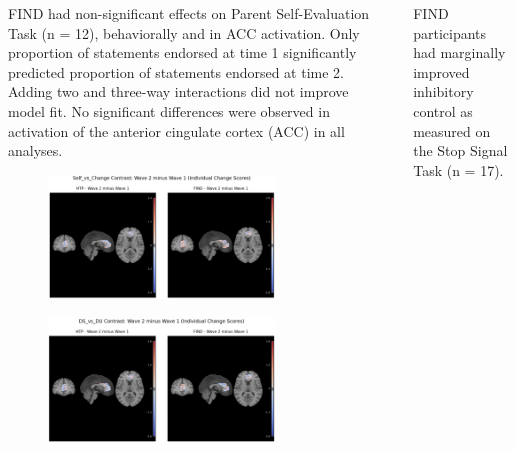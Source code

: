 \documentclass[final]{beamer}
\newlength{\sepwidth}
\newlength{\colwidth}
\newcommand{\separatorcolumn}{\begin{column}{\sepwidth}\end{column}}
\begin{document}
\begin{frame}[t]
\begin{columns}[t]
\begin{column}{\colwidth}
\begin{block}{FIND had non-significant effects on Parent Self-Evaluation Task (n = 12), behaviorally and in ACC activation.}
    Only proportion of statements endorsed at time 1 significantly predicted proportion of statements endorsed at time 2. Adding two and three-way interactions did not improve model fit. No significant differences were observed in activation of the anterior cingulate cortex (ACC) in all analyses.

    \vspace{-0.35cm}
    \begin{figure}[ht]
      \centering
      \includegraphics[clip, width=0.8\textwidth]{acc_selfchange.png}
      \label{fig:pset_selfchange}
    \end{figure}
    \vspace{-0.65cm}
    \begin{figure}[ht]
      \centering
      \includegraphics[clip, width=0.8\textwidth]{acc_dsdu.png}
      \label{fig:acc_dsdu}
    \end{figure}
  \end{block}

\end{column}

\separatorcolumn

\begin{column}{\colwidth}
    
      \begin{block}{FIND participants had marginally improved inhibitory control as measured on the Stop Signal Task (n = 17).}


\end{block}
\end{column}
\end{columns}
\end{frame}
\end{document}
